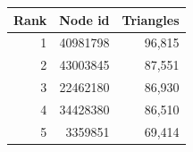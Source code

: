 \begin{tabular}{rrr}
\toprule
Rank & Node id & Triangles \\
\midrule
1 & 40981798 & 96,815 \\
2 & 43003845 & 87,551 \\
3 & 22462180 & 86,930 \\
4 & 34428380 & 86,510 \\
5 & 3359851 & 69,414 \\
\bottomrule
\end{tabular}
